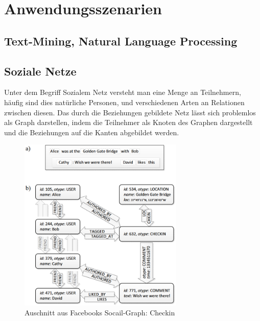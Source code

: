 \chapter{Anwendungsszenarien}
\section{Text-Mining, Natural Language Processing}
\section{Soziale Netze}
Unter dem Begriff Sozialem Netz versteht man eine Menge an Teilnehmern, häufig sind dies natürliche Personen, und verschiedenen Arten an Relationen zwischen diesen. Das durch die Beziehungen gebildete Netz lässt sich problemlos als Graph darstellen, indem die Teilnehmer als Knoten des Graphen dargestellt und die Beziehungen auf die Kanten abgebildet werden.

\begin{figure}
	\caption{Auschnitt aus Facebooks Socail-Graph: Checkin \cite{facebookTao}}
	\label{fig:fbCheckin}
	\centering
	\includegraphics[width=0.7\textwidth]{images/facebook_checkin.png}
\end{figure}

